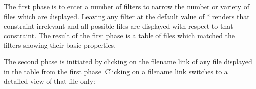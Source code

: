 \documentclass[letterpaper,10pt,english]{sphinxmanual}
\begin{document}
The first phase is to enter a number of filters to narrow the number or variety
of files which are displayed.   Leaving any filter at the default value of *
renders that constraint irrelevant and all possible files are displayed with
respect to that constraint.   The result of the first phase is a table of files
which matched the filters showing their basic properties.
\begin{figure}[htbp]
\centering

\end{figure}

The second phase is initiated by clicking on the filename link of any file
displayed in the table from the first phase.   Clicking on a filename link switches
to a detailed view of that file only:
\begin{figure}[htbp]
\centering

\end{figure}
\end{document}
